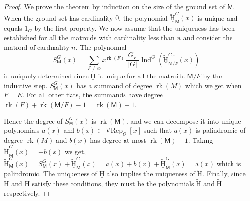 \documentclass[11pt, a4paper, english]{amsart}
\theoremstyle{teoremas}
\theoremstyle{definition}
\DeclareMathOperator{\rk}{rk}
\newcommand{\M}{\mathsf{M}}
\renewcommand{\H}{\mathrm{H}}
\newcommand{\uH}{\underline{\mathrm{H}}}
\newcommand{\VRep}{\operatorname{VRep}}
\newcommand{\Ind}{\operatorname{Ind}}
\begin{document}
\begin{proof}
    We prove the theorem by induction on the size of the ground set of \(\M\). When
    the ground set has cardinality \(0\), the polynomial \(\widetilde{\uH}_{\M}^G(x)\) is unique
    and equals \(1_G\) by the first property. We now assume that the uniqueness has been established
    for all the matroids with cardinality less than \(n\) and consider the matroid of cardinality
    \(n\). The polynomial
    \[
    S_\M^G(x) = \sum_{F \neq \varnothing} x^{\rk(F)}\,\frac{|G_{F}|}{|G|} \Ind^G\left(\widetilde{\uH}_{\M/F}^{G_F}(x)\right)
    \]
    is uniquely determined since \(\widetilde{\uH}\) is unique for all the matroids \(\M/F\) by the inductive
    step. \(S_\M^G(x)\) has a summand of degree \(\rk(M)\) which we get when \(F=E\). For all other flats, the
    summands have degree \(\rk(F) + \rk(\M/F) - 1 = \rk(\M) - 1\).

    Hence the degree of \(S_\M^G(x)\) is \(\rk(\M)\), and we can decompose it into unique polynomials
    \(a(x)\) and \(b(x)\in\VRep_G[x]\) such that \(a(x)\) is palindromic of degree \(\rk(M)\) and \(b(x)\) has degree at most
    \(\rk(\M) - 1\). Taking \(\widetilde{\uH}_{\M}^G(x) = -b(x)\) we get,
    \(
    \widetilde{\H}_{\M}^G(x) = S_\M^G(x) + \widetilde{\uH}_{\M}^G(x) = 
    a(x) + b(x) + \widetilde{\uH}_{\M}^G(x) = a(x)
    \)
    which is palindromic. The uniqueness of \(\widetilde{\uH}\) also implies the
    uniqueness of \(\widetilde{\H}\). Finally, since \(\uH\) and \(\H\) satisfy these
    conditions, they must be the polynomials \(\widetilde{\uH}\) and \(\widetilde{\H}\)
    respectively.
\end{proof}
\end{document}
